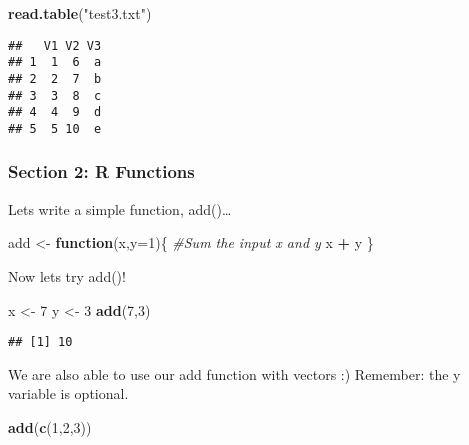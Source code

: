 \documentclass[]{article}
\newenvironment{Shaded}{\begin{snugshade}}{\end{snugshade}}
\newcommand{\KeywordTok}[1]{\textcolor[rgb]{0.13,0.29,0.53}{\textbf{#1}}}
\newcommand{\DataTypeTok}[1]{\textcolor[rgb]{0.13,0.29,0.53}{#1}}
\newcommand{\DecValTok}[1]{\textcolor[rgb]{0.00,0.00,0.81}{#1}}
\newcommand{\StringTok}[1]{\textcolor[rgb]{0.31,0.60,0.02}{#1}}
\newcommand{\CommentTok}[1]{\textcolor[rgb]{0.56,0.35,0.01}{\textit{#1}}}
\newcommand{\ControlFlowTok}[1]{\textcolor[rgb]{0.13,0.29,0.53}{\textbf{#1}}}
\newcommand{\OperatorTok}[1]{\textcolor[rgb]{0.81,0.36,0.00}{\textbf{#1}}}
\newcommand{\NormalTok}[1]{#1}
\begin{document}
\begin{Shaded}
\begin{Highlighting}[]
\KeywordTok{read.table}\NormalTok{(}\StringTok{"test3.txt"}\NormalTok{)}
\end{Highlighting}
\end{Shaded}

\begin{verbatim}
##   V1 V2 V3
## 1  1  6  a
## 2  2  7  b
## 3  3  8  c
## 4  4  9  d
## 5  5 10  e
\end{verbatim}

\subsubsection{Section 2: R Functions}\label{section-2-r-functions}

Lets write a simple function, add()\ldots{}

\begin{Shaded}
\begin{Highlighting}[]
\NormalTok{add <-}\StringTok{ }\ControlFlowTok{function}\NormalTok{(x,}\DataTypeTok{y=}\DecValTok{1}\NormalTok{)\{}
  \CommentTok{#Sum the input x and y}
\NormalTok{  x }\OperatorTok{+}\StringTok{ }\NormalTok{y}
\NormalTok{\}}
\end{Highlighting}
\end{Shaded}

Now lets try add()!

\begin{Shaded}
\begin{Highlighting}[]
\NormalTok{x <-}\StringTok{ }\DecValTok{7}
\NormalTok{y <-}\StringTok{ }\DecValTok{3}
\KeywordTok{add}\NormalTok{(}\DecValTok{7}\NormalTok{,}\DecValTok{3}\NormalTok{)}
\end{Highlighting}
\end{Shaded}

\begin{verbatim}
## [1] 10
\end{verbatim}

We are also able to use our add function with vectors :) Remember: the y
variable is optional.

\begin{Shaded}
\begin{Highlighting}[]
\KeywordTok{add}\NormalTok{(}\KeywordTok{c}\NormalTok{(}\DecValTok{1}\NormalTok{,}\DecValTok{2}\NormalTok{,}\DecValTok{3}\NormalTok{))}
\end{Highlighting}
\end{Shaded}
\end{document}
